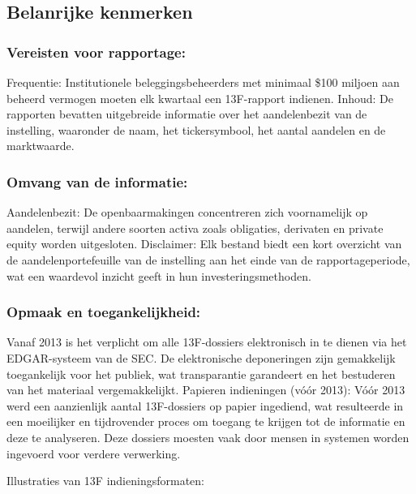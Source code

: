 \subsection{Belanrijke kenmerken}

\subsubsection{Vereisten voor rapportage:}

Frequentie: Institutionele beleggingsbeheerders met minimaal \$100 miljoen aan beheerd vermogen moeten elk kwartaal een 13F-rapport indienen.
Inhoud: De rapporten bevatten uitgebreide informatie over het aandelenbezit van de instelling, waaronder de naam, het tickersymbool, het aantal aandelen en de marktwaarde.
\subsubsection{Omvang van de informatie:}

Aandelenbezit: De openbaarmakingen concentreren zich voornamelijk op aandelen, terwijl andere soorten activa zoals obligaties, derivaten en private equity worden uitgesloten.
Disclaimer: Elk bestand biedt een kort overzicht van de aandelenportefeuille van de instelling aan het einde van de rapportageperiode, wat een waardevol inzicht geeft in hun investeringsmethoden.
\subsubsection{Opmaak en toegankelijkheid:}

Vanaf 2013 is het verplicht om alle 13F-dossiers elektronisch in te dienen via het EDGAR-systeem van de SEC. De elektronische deponeringen zijn gemakkelijk toegankelijk voor het publiek, wat transparantie garandeert en het bestuderen van het materiaal vergemakkelijkt.
Papieren indieningen (vóór 2013): Vóór 2013 werd een aanzienlijk aantal 13F-dossiers op papier ingediend, wat resulteerde in een moeilijker en tijdrovender proces om toegang te krijgen tot de informatie en deze te analyseren. Deze dossiers moesten vaak door mensen in systemen worden ingevoerd voor verdere verwerking.

Illustraties van 13F indieningsformaten:

